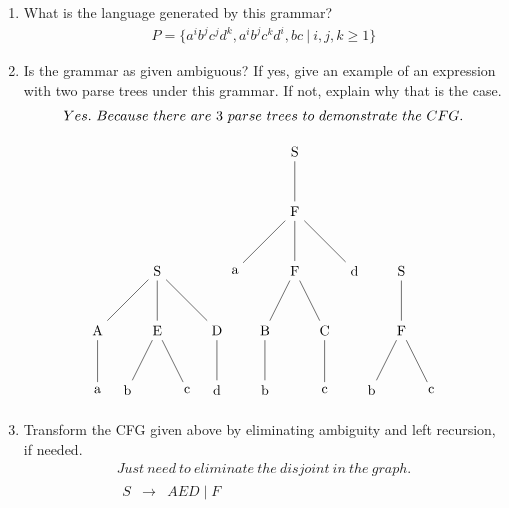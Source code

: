 \documentclass[10pt]{article}
\begin{document}
\begin{enumerate}
\begin{enumerate}
\item What is the language generated by this grammar?
            \[
            \begin{array}{cll}
            P = \{a^ib^jc^jd^k, a^ib^jc^kd^i,bc \ | \ i,j,k\geq 1\}
            \end{array}
            \]
\item Is the grammar as given ambiguous? If yes, give an example of an expression
with two parse trees under this grammar. If not, explain why that is the case.
            \[
            \begin{array}{cll}
            Yes.\ Because\ there\ are\ 3\ parse\ trees\ to\ demonstrate\ the\ CFG.\\\\
            \begin{tikzpicture}
              \node  {S}
                child{node  {A}
                  child{node  {a}}}
                child{node  {E}
                  child{node{b}}
                  child{node{c}}}
                child{node  {D}
                  child{node{d}}};
              \end{tikzpicture}
              \begin{tikzpicture}
                \node  {S}
                  child{node  {F}
                    child{node  {a}}
                    child{node  {F}
                    child{node  {B}
                    child{node  {b}}}
                    child{node  {C}
                    child{node  {c}}}}
                    child{node  {d}}};
                \end{tikzpicture}
                \begin{tikzpicture}
                  \node  {S}
                    child{node  {F}
                      child{node  {b}}
                      child{node  {c}}};
                  \end{tikzpicture}
            \end{array}
            \]
\item Transform the CFG given above by eliminating ambiguity and
left recursion, if needed.
            \[
            \begin{array}{cll}
            Just\ need \ to \ eliminate \ the \ disjoint \ in \ the \ graph.\\
            \begin{array}{cll}
              S & \rightarrow & AED \mid F \\

\end{array}
\end{array}\]
\end{enumerate}
\end{enumerate}
\end{document}
